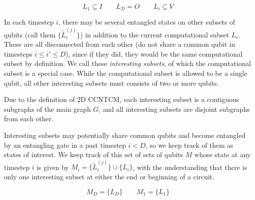 \begin{equation}
L_1 \subseteq I \qquad L_D = O \qquad L_i \subseteq V
\end{equation}

In each timestep $i$, there may be several entangled states on other
subsets of qubits
(call them $\{\tilde{L}^{(j)}_i\}$) in addition to the current
computational subset $L_i$. These are all
disconnected from each other (do not share a common qubit in timesteps $i \le i' \le D$),
since if they did, they would be the same computational subset by definition.
We call these \emph{interesting subsets}, of which the computational subset is
a special case. While the computational subset is allowed to be a single qubit,
all other interesting subsets must consists of two or more qubits.

Due to the definition of \textsf{2D CCNTCM}, each interesting subset is a
contiguous subgraphs of the main graph $G$, and all interesting subsets are
disjoint subgraphs from each other.

Interesting subsets may potentially share common qubits and become entangled by an entangling gate
in a past timestep $i < D$, so we keep track of them as states of interest.
We keep track of this set of sets of qubits $M$ whose state at any
timestep $i$ is given by $M_i = \{\tilde{L}^{(j)}_i\} \cup \{ L_i \}$,
with the understanding that there is only one interesting subset at either the
end or beginning of a circuit.

\begin{equation}
M_D = \{ L_D \} \qquad M_1 = \{ L_1 \}
\end{equation}

